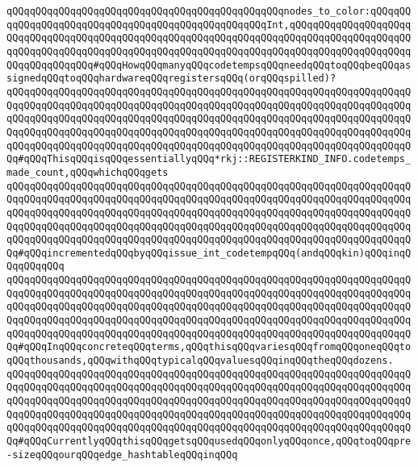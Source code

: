 \newline
\verb|qQQqqQQqqQQqqQQqqQQqqQQqqQQqqQQqqQQqqQQqqQQqqQQqnodes_to_color:qQQqqQQqqQQqqQQqqQQqqQQqqQQqqQQqqQQqqQQqqQQqqQQqqQQqInt,qQQqqQQqqQQqqQQqqQQqqQQqqQQqqQQqqQQqqQQqqQQqqQQqqQQqqQQqqQQqqQQqqQQqqQQqqQQqqQQqqQQqqQQqqQQqqQQqqQQqqQQqqQQqqQQqqQQqqQQqqQQqqQQqqQQqqQQqqQQqqQQqqQQqqQQqqQQqqQQqqQQqqQQqqQQqqQQq#qQQqHowqQQqmanyqQQqcodetempsqQQqneedqQQqtoqQQqbeqQQqassignedqQQqtoqQQqhardwareqQQqregistersqQQq(orqQQqspilled)?|\newline
\verb|qQQqqQQqqQQqqQQqqQQqqQQqqQQqqQQqqQQqqQQqqQQqqQQqqQQqqQQqqQQqqQQqqQQqqQQqqQQqqQQqqQQqqQQqqQQqqQQqqQQqqQQqqQQqqQQqqQQqqQQqqQQqqQQqqQQqqQQqqQQqqQQqqQQqqQQqqQQqqQQqqQQqqQQqqQQqqQQqqQQqqQQqqQQqqQQqqQQqqQQqqQQqqQQqqQQqqQQqqQQqqQQqqQQqqQQqqQQqqQQqqQQqqQQqqQQqqQQqqQQqqQQqqQQqqQQqqQQqqQQqqQQqqQQqqQQqqQQqqQQqqQQqqQQqqQQqqQQqqQQqqQQqqQQqqQQqqQQqqQQqqQQqqQQqqQQq#qQQqThisqQQqisqQQqessentiallyqQQq*rkj::REGISTERKIND_INFO.codetemps_made_count,qQQqwhichqQQqgets|\newline
\verb|qQQqqQQqqQQqqQQqqQQqqQQqqQQqqQQqqQQqqQQqqQQqqQQqqQQqqQQqqQQqqQQqqQQqqQQqqQQqqQQqqQQqqQQqqQQqqQQqqQQqqQQqqQQqqQQqqQQqqQQqqQQqqQQqqQQqqQQqqQQqqQQqqQQqqQQqqQQqqQQqqQQqqQQqqQQqqQQqqQQqqQQqqQQqqQQqqQQqqQQqqQQqqQQqqQQqqQQqqQQqqQQqqQQqqQQqqQQqqQQqqQQqqQQqqQQqqQQqqQQqqQQqqQQqqQQqqQQqqQQqqQQqqQQqqQQqqQQqqQQqqQQqqQQqqQQqqQQqqQQqqQQqqQQqqQQqqQQqqQQqqQQqqQQqqQQq#qQQqincrementedqQQqbyqQQqissue_int_codetempqQQq(andqQQqkin)qQQqinqQQqqQQqqQQq|\newline
\verb|qQQqqQQqqQQqqQQqqQQqqQQqqQQqqQQqqQQqqQQqqQQqqQQqqQQqqQQqqQQqqQQqqQQqqQQqqQQqqQQqqQQqqQQqqQQqqQQqqQQqqQQqqQQqqQQqqQQqqQQqqQQqqQQqqQQqqQQqqQQqqQQqqQQqqQQqqQQqqQQqqQQqqQQqqQQqqQQqqQQqqQQqqQQqqQQqqQQqqQQqqQQqqQQqqQQqqQQqqQQqqQQqqQQqqQQqqQQqqQQqqQQqqQQqqQQqqQQqqQQqqQQqqQQqqQQqqQQqqQQqqQQqqQQqqQQqqQQqqQQqqQQqqQQqqQQqqQQqqQQqqQQqqQQqqQQqqQQqqQQqqQQqqQQqqQQq#qQQqInqQQqconcreteqQQqterms,qQQqthisqQQqvariesqQQqfromqQQqoneqQQqtoqQQqthousands,qQQqwithqQQqtypicalqQQqvaluesqQQqinqQQqtheqQQqdozens.|\newline
\verb|qQQqqQQqqQQqqQQqqQQqqQQqqQQqqQQqqQQqqQQqqQQqqQQqqQQqqQQqqQQqqQQqqQQqqQQqqQQqqQQqqQQqqQQqqQQqqQQqqQQqqQQqqQQqqQQqqQQqqQQqqQQqqQQqqQQqqQQqqQQqqQQqqQQqqQQqqQQqqQQqqQQqqQQqqQQqqQQqqQQqqQQqqQQqqQQqqQQqqQQqqQQqqQQqqQQqqQQqqQQqqQQqqQQqqQQqqQQqqQQqqQQqqQQqqQQqqQQqqQQqqQQqqQQqqQQqqQQqqQQqqQQqqQQqqQQqqQQqqQQqqQQqqQQqqQQqqQQqqQQqqQQqqQQqqQQqqQQqqQQqqQQqqQQqqQQq#qQQqCurrentlyqQQqthisqQQqgetsqQQqusedqQQqonlyqQQqonce,qQQqtoqQQqpre-sizeqQQqourqQQqedge_hashtableqQQqinqQQq|\newline
